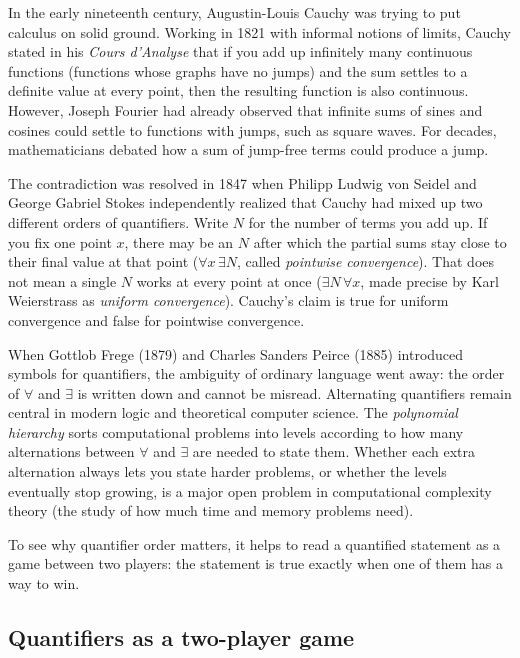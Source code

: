 \begin{historybox}
In the early nineteenth century, Augustin-Louis Cauchy was trying to put calculus on solid ground. Working in 1821 with informal notions of limits, Cauchy stated in his \emph{Cours d'Analyse} that if you add up infinitely many continuous functions (functions whose graphs have no jumps) and the sum settles to a definite value at every point, then the resulting function is also continuous. However, Joseph Fourier had already observed that infinite sums of sines and cosines could settle to functions with jumps, such as square waves. For decades, mathematicians debated how a sum of jump-free terms could produce a jump.

The contradiction was resolved in 1847 when Philipp Ludwig von Seidel and George Gabriel Stokes independently realized that Cauchy had mixed up two different orders of quantifiers. Write $N$ for the number of terms you add up. If you fix one point $x$, there may be an $N$ after which the partial sums stay close to their final value at that point ($\forall x \, \exists N$, called \emph{pointwise convergence}). That does not mean a single $N$ works at every point at once ($\exists N \, \forall x$, made precise by Karl Weierstrass as \emph{uniform convergence}). Cauchy's claim is true for uniform convergence and false for pointwise convergence.

When Gottlob Frege (1879) and Charles Sanders Peirce (1885) introduced symbols for quantifiers, the ambiguity of ordinary language went away: the order of $\forall$ and $\exists$ is written down and cannot be misread. Alternating quantifiers remain central in modern logic and theoretical computer science. The \emph{polynomial hierarchy} sorts computational problems into levels according to how many alternations between $\forall$ and $\exists$ are needed to state them. Whether each extra alternation always lets you state harder problems, or whether the levels eventually stop growing, is a major open problem in computational complexity theory (the study of how much time and memory problems need).
\end{historybox}

To see why quantifier order matters, it helps to read a quantified statement as a game between two players: the statement is true exactly when one of them has a way to win.

\subsection{Quantifiers as a two-player game}

